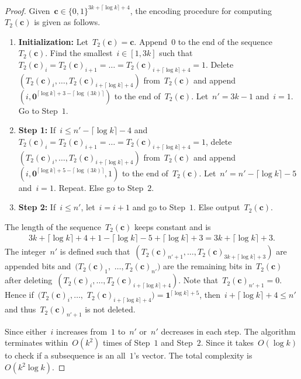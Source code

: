 \documentclass[10pt,a4paper,onecolumn]{IEEEtran}
\newcommand{\1}{\mathbbold{1}}
\newcommand{\boldc}{\mathbf{c}}
\begin{document}
\begin{proof}
Given~$\boldc\in\{0,1\}^{3k+\lceil \log k\rceil+4}$, the encoding procedure for computing~$T_2(\boldc)$ is given as follows.
\begin{enumerate}
    \item \textbf{Initialization:} Let~$T_2(\boldc)=\boldc$.
    Append~$0$ to the end of the sequence~$T_2(\boldc)$. Find the smallest~$i\in [1,3k]$ such that~$T_2(\boldc)_i=T_2(\boldc)_{i+1}=\ldots=T_2(\boldc)_{i+\lceil \log k \rceil +4}=1$. Delete~$(T_2(\boldc)_i,\ldots,T_2(\boldc)_{i+\lceil \log k \rceil +4})$ from~$T_2(\boldc)$ and append~$(i,\boldsymbol{0}^{\lceil \log k\rceil +3-\lceil \log (3k) \rceil})$ to the end of~$T_2(\boldc)$. Let~$n'=3k-1$ and~$i=1$.
    Go to Step~$1$.
    \item \textbf{Step 1:} If~$i\le n'-\lceil \log k \rceil-4$ and~$T_2(\boldc)_i=T_2(\boldc)_{i+1}=\ldots=T_2(\boldc)_{i+\lceil \log k \rceil +4}=1$, 
    delete~$(T_2(\boldc)_i,\ldots,T_2(\boldc)_{i+\lceil \log k \rceil +4})$ from~$T_2(\boldc)$ and  append~$(i,\boldsymbol{0}^{\lceil \log k \rceil+5-\lceil \log (3k) \rceil},1)$ to the end of~$T_2(\boldc)$. Let~$n'=n'-\lceil \log k\rceil -5$ and~$i=1$. Repeat.
    Else go to Step~$2$.
    \item \textbf{Step 2:}
    If~$i\le n'$, let~$i=i+1$ and go to Step~$1$.
    Else output~$T_2(\boldc)$. 
\end{enumerate}
The length of the sequence~$T_2(\boldc)$ keeps constant and is
\begin{align*}
    3k+\lceil \log k\rceil+4+1-\lceil \log k \rceil -5+\lceil \log k\rceil+3=3k+\lceil \log k\rceil+3.
\end{align*}
The integer~$n'$ is defined such that~$(T_2(\boldc)_{n'+1},\ldots,T_2(\boldc)_{3k+\lceil \log k\rceil+3})$ are appended bits and~$(T_2(\boldc)_{1},$ $\ldots,T_2(\boldc)_{n'})$ are the remaining bits in~$T_2(\boldc)$ after deleting~$(T_2(\boldc)_i,\ldots,T_2(\boldc)_{i+\lceil \log k \rceil +4})$. Note that~$T_2(\boldc)_{n'+1}=0$. Hence if~$(T_2(\boldc)_i,\ldots,$ $T_2(\boldc)_{i+\lceil \log k\rceil+4})=\boldsymbol{1}^{\lceil \log k\rceil+5}$, then~$i+\lceil \log k\rceil+4\le n'$ and thus~$T_2(\boldc)_{n'+1}$ is not deleted.


Since either~$i$ increases from~$1$ to~$n'$ or~$n'$ decreases in each step. The algorithm terminates within~$O(k^2)$ times of Step~$1$ and Step~$2$. Since it takes~$O(\log k)$ to check if a subsequence is an all~$1$'s vector. The total complexity is~$O(k^2\log k)$.



\end{proof}
\end{document}
